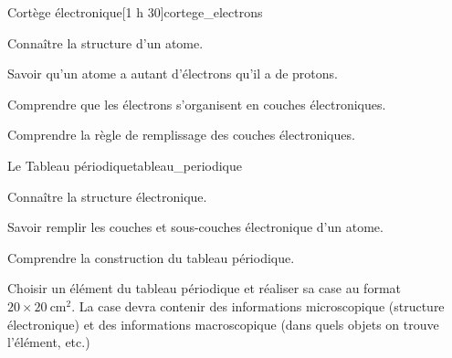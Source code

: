 \begin{multicols}{2}    
  \begin{activite}{Cortège électronique}[1 h 30]{cortege_electrons}
    \begin{prerequis}
      \item Connaître la structure d'un atome.
      \item Savoir qu'un atome a autant d'électrons qu'il a de protons.
    \end{prerequis}
    \begin{objectifs}
      \item Comprendre que les électrons s'organisent en couches électroniques.
      \item Comprendre la règle de remplissage des couches électroniques.
    \end{objectifs}
  \end{activite}

  \phantom{\strut}
  
  \begin{TP}{Le Tableau périodique}{tableau_periodique}
    \begin{prerequis}
      \item Connaître la structure électronique.
      \item Savoir remplir les couches et sous-couches électronique d'un atome.
    \end{prerequis}
    \begin{objectifs}
      \item Comprendre la construction du tableau périodique.
    \end{objectifs}
  \end{TP}
\end{multicols}
    

\vspace*{-40pt}
\begin{tacheFinale}
  Choisir un élément du tableau périodique et réaliser sa case au format $20\times\qty{20}{\cm\squared}$.
  La case devra contenir des informations microscopique (structure électronique) et des informations macroscopique (dans quels objets on trouve l'élément, etc.)
\end{tacheFinale}